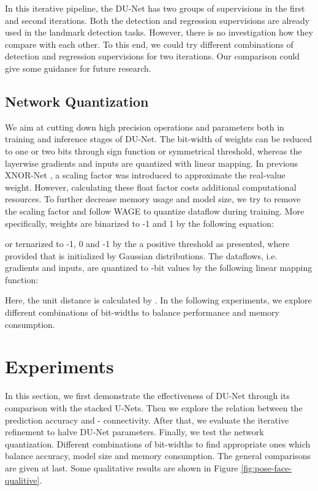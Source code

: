 \documentclass[runningheads]{llncs}
\begin{document}
In this iterative pipeline, the DU-Net has two groups of supervisions in the first and second iterations. Both the detection and regression supervisions \cite{bulat2016human} are already used in the landmark detection tasks. However, there is no investigation how they compare with each other. To this end, we could try different combinations of detection and regression supervisions for two iterations. Our comparison could give some guidance for future research. 


\subsection{Network Quantization}

We aim at cutting down high precision operations and parameters both in training and inference stages of DU-Net. The bit-width of weights can be reduced to one or two bits through sign function or symmetrical threshold, whereas the layerwise gradients and inputs are quantized with linear mapping. In previous XNOR-Net \cite{rastegari2016xnor}, a scaling factor was introduced to approximate the real-value weight. However, calculating these float factor costs additional computational resources. To further decrease memory usage and model size, we try to remove the scaling factor and follow WAGE \cite{wu2018training} to quantize dataflow during training. More specifically, weights are binarized to -1 and 1 by the following equation:
 
or ternarized to -1, 0 and -1 by the a positive threshold  as \cite{li2016ternary} presented, where  provided that  is initialized by Gaussian distributions. The dataflows, i.e. gradients and inputs, are quantized to -bit values by the following linear mapping function:
 
Here, the unit distance  is calculated by . In the following experiments, we explore different combinations of bit-widths to balance performance and memory consumption.
 
\section{Experiments}

In this section, we first demonstrate the effectiveness of DU-Net through its comparison with the stacked U-Nets. Then we explore the relation between the prediction accuracy and - connectivity. After that, we evaluate the iterative refinement to halve DU-Net parameters. Finally, we test the network quantization. Different combinations of bit-widths to find appropriate ones which balance accuracy, model size and memory consumption. The general comparisons are given at last. Some qualitative results are shown in Figure \ref{fig:pose-face-qualitive}.
\end{document}
